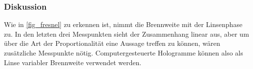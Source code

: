 \documentclass[
	a4paper,
	12pt,
	pagesize,
	ngerman
]{scrartcl}
\begin{document}
			\subsubsection*{Diskussion}

		Wie in \cref{fig_fresnel} zu erkennen ist, nimmt die Brennweite mit der Linsenphase zu.
		In den letzten drei Messpunkten sieht der Zusammenhang linear aus, aber um über die Art der Proportionalität eine Aussage treffen zu können, wären zusätzliche Messpunkte nötig.
		Computergesteuerte Hologramme können also als Linse variabler Brennweite verwendet werden.
\end{document}

